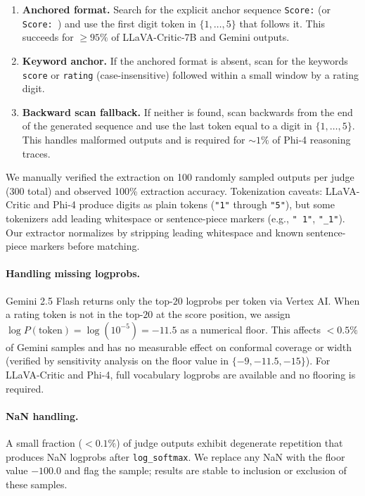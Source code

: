\documentclass{article}
\begin{document}
\begin{enumerate}[leftmargin=*,itemsep=2pt,topsep=2pt]
\item \textbf{Anchored format.} Search for the explicit anchor sequence \texttt{Score:} (or \texttt{Score: }) and use the first digit token in $\{1,\dots,5\}$ that follows it. This succeeds for $\geq 95\%$ of LLaVA-Critic-7B and Gemini outputs.
\item \textbf{Keyword anchor.} If the anchored format is absent, scan for the keywords \texttt{score} or \texttt{rating} (case-insensitive) followed within a small window by a rating digit.
\item \textbf{Backward scan fallback.} If neither is found, scan backwards from the end of the generated sequence and use the last token equal to a digit in $\{1,\dots,5\}$. This handles malformed outputs and is required for $\sim 1\%$ of Phi-4 reasoning traces.
\end{enumerate}

We manually verified the extraction on 100 randomly sampled outputs per judge ($300$ total) and observed 100\% extraction accuracy. Tokenization caveats: LLaVA-Critic and Phi-4 produce digits as plain tokens (\texttt{"1"} through \texttt{"5"}), but some tokenizers add leading whitespace or sentence-piece markers (e.g., \texttt{"\,1"}, \texttt{"\_1"}). Our extractor normalizes by stripping leading whitespace and known sentence-piece markers before matching.

\paragraph{Handling missing logprobs.}
Gemini 2.5 Flash returns only the top-$20$ logprobs per token via Vertex AI. When a rating token is not in the top-$20$ at the score position, we assign $\log P(\text{token}) = \log(10^{-5}) = -11.5$ as a numerical floor. This affects $< 0.5\%$ of Gemini samples and has no measurable effect on conformal coverage or width (verified by sensitivity analysis on the floor value in $\{-9, -11.5, -15\}$). For LLaVA-Critic and Phi-4, full vocabulary logprobs are available and no flooring is required.

\paragraph{NaN handling.}
A small fraction ($< 0.1\%$) of judge outputs exhibit degenerate repetition that produces NaN logprobs after \texttt{log\_softmax}. We replace any NaN with the floor value $-100.0$ and flag the sample; results are stable to inclusion or exclusion of these samples.
\end{document}
